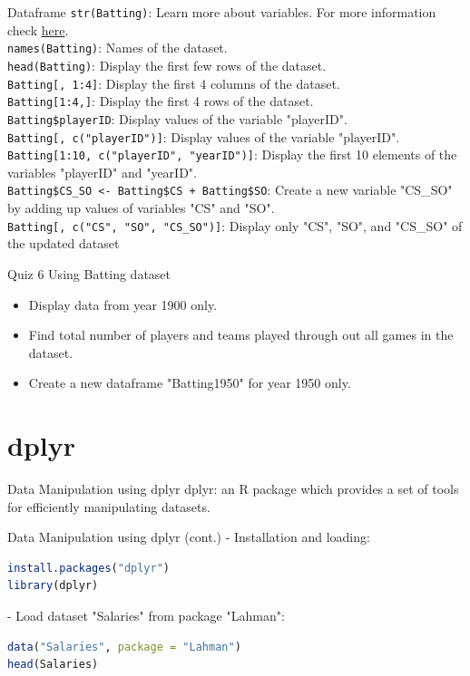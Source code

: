 \documentclass{beamer}
\begin{document}
\begin{frame}{Dataframe}
\texttt{str(Batting)}: Learn more about variables. For more information check \href{https://rdrr.io/cran/Lahman/man/Batting.html}{here}.\\
\texttt{names(Batting)}: Names of the dataset.\\
\texttt{head(Batting)}: Display the first few rows of the dataset.\\
\texttt{Batting[, 1:4]}: Display the first 4 columns of the dataset.\\
\texttt{Batting[1:4,]}: Display the first 4 rows of the dataset.\\
\texttt{Batting\$playerID}: Display values of the variable "playerID".\\
\texttt{Batting[, c("playerID")]}: Display values of the variable "playerID".\\
\texttt{Batting[1:10, c("playerID", "yearID")]}: Display the first 10 elements of the variables "playerID" and "yearID".\\
\texttt{Batting\$CS\_SO <- Batting\$CS + Batting\$SO}: Create a new variable "CS\_SO" by adding up values of variables "CS" and "SO".\\
\texttt{Batting[, c("CS", "SO", "CS\_SO")]}: Display only "CS", "SO", and "CS\_SO" of the updated dataset
\end{frame}

\begin{frame}{Quiz 6}
Using Batting dataset
\begin{itemize}
    \item Display data from year 1900 only.
    \item Find total number of players and teams played through out all games in the dataset.
    \item Create a new dataframe "Batting1950" for year 1950 only.
\end{itemize}
\end{frame}

\section{dplyr}

\begin{frame}{Data Manipulation using dplyr}
dplyr: an R package which provides a set of tools for efficiently manipulating datasets.
    
\end{frame}

\begin{frame}[fragile]{Data Manipulation using dplyr (cont.)}
- Installation and loading:
\begin{lstlisting}[language=R]
install.packages("dplyr")
library(dplyr)
\end{lstlisting}

- Load dataset "Salaries" from package "Lahman":
\begin{lstlisting}[language=R]
data("Salaries", package = "Lahman")
head(Salaries)
\end{lstlisting}
\end{frame}
\end{document}
